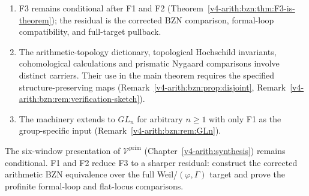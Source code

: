 \begin{enumerate}
shadow.
\item F3 remains conditional after F1 and F2
(Theorem~\ref{v4-arith:bzn:thm:F3-is-theorem}); the residual is the
corrected BZN comparison, formal-loop compatibility, and full-target
pullback.
\item The arithmetic-topology dictionary, topological Hochschild
invariants, cohomological calculations and prismatic Nygaard
comparisons involve distinct carriers. Their use in the main theorem
requires the specified structure-preserving maps
(Remark~\ref{v4-arith:bzn:prop:disjoint},
Remark~\ref{v4-arith:bzn:rem:verification-sketch}).
\item The machinery extends to \(GL_{n}\) for arbitrary \(n\geq 1\)
with only F1 as the group-specific input
(Remark~\ref{v4-arith:bzn:rem:GLn}).
\end{enumerate}

The six-window presentation of \(\mathcal{V}^{\mathrm{prim}}\)
(Chapter~\ref{v4-arith:synthesis}) remains conditional. F1 and
F2 reduce F3 to a sharper residual: construct the corrected arithmetic
BZN equivalence over the full Weil/\((\varphi,\Gamma)\) target and
prove the profinite formal-loop and flat-locus comparisons.
